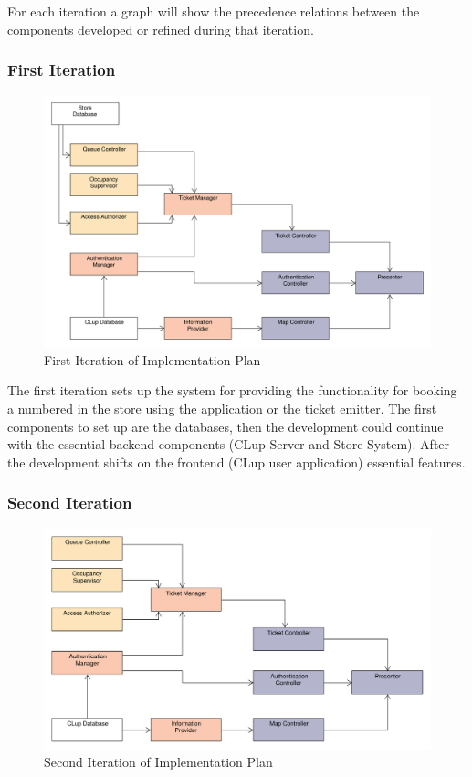 For each iteration a graph will show the precedence relations between the components developed or refined during that iteration.

\subsubsection{First Iteration}
\begin{figure}[H]
    \includegraphics[width=\textwidth]{Images/Impl_Plan_1.pdf}
    \caption{\label{fig:UML_virtual_ticket_sequence}First Iteration of Implementation Plan}
\end{figure}

The first iteration sets up the system for providing the functionality for booking a numbered in the store using the application or the ticket emitter. The first components to set up are the databases, then the development could continue with the essential backend components (CLup Server and Store System). After the development shifts on the frontend (CLup user application) essential features.

\subsubsection{Second Iteration}

\begin{figure}[H]
    \includegraphics[width=\textwidth]{Images/Impl_Plan_2.pdf}
    \caption{\label{fig:UML_virtual_ticket_sequence}Second Iteration of Implementation Plan}
\end{figure}


